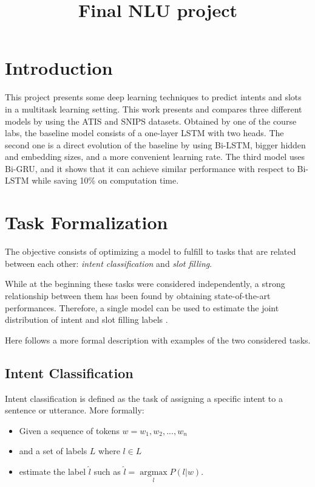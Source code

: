 \documentclass[a4paper]{article}
\title{Final NLU project}
\begin{document}
\maketitle



\section{Introduction}
This project presents some deep learning techniques to predict intents and slots in a multitask learning setting. This work presents and compares three different models by using the ATIS and SNIPS datasets.
Obtained by one of the course labs, the baseline model consists of a one-layer LSTM with two heads. The second one is a direct evolution of the baseline by using Bi-LSTM, bigger hidden and embedding sizes, and a more convenient learning rate. The third model uses Bi-GRU, and it shows that it can achieve similar performance with respect to Bi-LSTM while saving 10\% on computation time.

\section{Task Formalization}
The objective consists of optimizing a model to fulfill to tasks that are related between each other: \emph{intent classification} and \emph{slot filling}.

While at the beginning these tasks were considered independently, a strong relationship between them has been found by obtaining state-of-the-art performances. Therefore, a single model can be used to estimate the joint distribution of intent and slot filling labels \cite{DBLP:journals/corr/abs-2101-08091}.

Here follows a more formal description with examples of the two considered tasks.

\subsection{Intent Classification}
Intent classification is defined as the task of assigning a specific intent to a sentence or utterance.
More formally:
\begin{itemize}
    \item Given a sequence of tokens $w = {w_1, w_2, ..., w_n}$
    \item and a set of labels $L$ where $l \in L$
    \item estimate the label $\hat{l}$ such as $\hat{l} = \underset{l}{\operatorname{argmax}} P(l|w)$.
\end{itemize}
\end{document}
